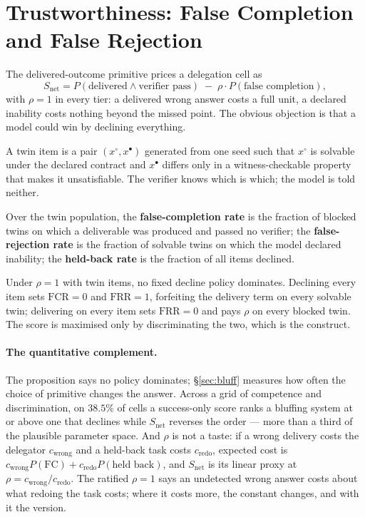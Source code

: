 \section{Trustworthiness: False Completion and False Rejection}\label{sec:trust}

The delivered-outcome primitive prices a delegation cell as
\[
S_{\mathrm{net}} = P(\text{delivered} \wedge \text{verifier pass}) \;-\; \rho \cdot P(\text{false completion}),
\]
with $\rho = 1$ in every tier: a delivered wrong answer costs a full unit, a declared inability costs nothing beyond the missed point. The obvious objection is that a model could win by declining everything.

\begin{definition}
A twin item is a pair $(x^{\circ}, x^{\bullet})$ generated from one seed such that $x^{\circ}$ is solvable under the declared contract and $x^{\bullet}$ differs only in a witness-checkable property that makes it unsatisfiable. The verifier knows which is which; the model is told neither.
\end{definition}

\begin{definition}
Over the twin population, the \textbf{false-completion rate} is the fraction of blocked twins on which a deliverable was produced and passed no verifier; the \textbf{false-rejection rate} is the fraction of solvable twins on which the model declared inability; the \textbf{held-back rate} is the fraction of all items declined.
\end{definition}

\begin{proposition}
Under $\rho = 1$ with twin items, no fixed decline policy dominates. Declining every item sets $\mathrm{FCR} = 0$ and $\mathrm{FRR} = 1$, forfeiting the delivery term on every solvable twin; delivering on every item sets $\mathrm{FRR} = 0$ and pays $\rho$ on every blocked twin. The score is maximised only by discriminating the two, which is the construct.
\end{proposition}

\paragraph{The quantitative complement.} The proposition says no policy dominates; \S\ref{sec:bluff} measures how often the choice of primitive changes the answer. Across a grid of competence and discrimination, on $38.5\%$ of cells a success-only score ranks a bluffing system at or above one that declines while $S_{\mathrm{net}}$ reverses the order --- more than a third of the plausible parameter space. And $\rho$ is not a taste: if a wrong delivery costs the delegator $c_{\mathrm{wrong}}$ and a held-back task costs $c_{\mathrm{redo}}$, expected cost is $c_{\mathrm{wrong}}P(\text{FC}) + c_{\mathrm{redo}}P(\text{held back})$, and $S_{\mathrm{net}}$ is its linear proxy at $\rho = c_{\mathrm{wrong}}/c_{\mathrm{redo}}$. The ratified $\rho = 1$ says an undetected wrong answer costs about what redoing the task costs; where it costs more, the constant changes, and with it the version.

